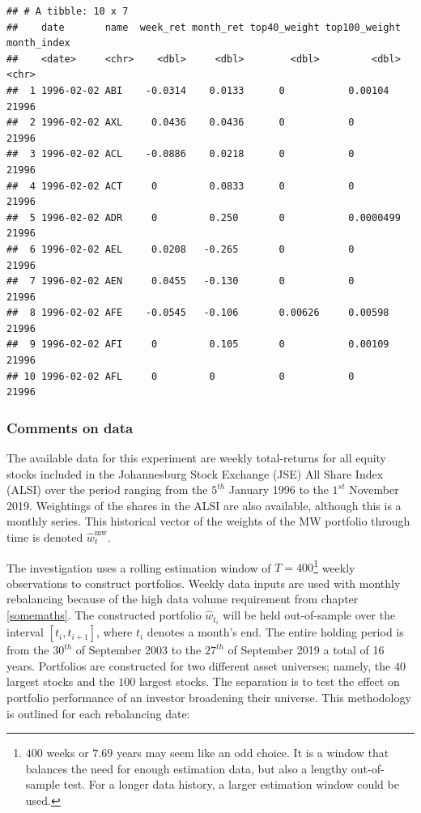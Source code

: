 \documentclass[
]{article}
\begin{document}
\begin{verbatim}
## # A tibble: 10 x 7
##    date       name  week_ret month_ret top40_weight top100_weight month_index
##    <date>     <chr>    <dbl>     <dbl>        <dbl>         <dbl> <chr>      
##  1 1996-02-02 ABI    -0.0314    0.0133      0           0.00104   21996      
##  2 1996-02-02 AXL     0.0436    0.0436      0           0         21996      
##  3 1996-02-02 ACL    -0.0886    0.0218      0           0         21996      
##  4 1996-02-02 ACT     0         0.0833      0           0         21996      
##  5 1996-02-02 ADR     0         0.250       0           0.0000499 21996      
##  6 1996-02-02 AEL     0.0208   -0.265       0           0         21996      
##  7 1996-02-02 AEN     0.0455   -0.130       0           0         21996      
##  8 1996-02-02 AFE    -0.0545   -0.106       0.00626     0.00598   21996      
##  9 1996-02-02 AFI     0         0.105       0           0.00109   21996      
## 10 1996-02-02 AFL     0         0           0           0         21996
\end{verbatim}

\hypertarget{comments-on-data}{%
\subsubsection{Comments on data}\label{comments-on-data}}

The available data for this experiment are weekly total-returns for all equity stocks included in the
Johannesburg Stock Exchange (JSE) All Share Index (ALSI) over the period ranging from the \(5^{th}\)
January 1996 to the \(1^{st}\) November 2019. Weightings of the shares in the ALSI are also available,
although this is a monthly series. This historical vector of the weights of the MW portfolio through
time is denoted \(\hat{w}^{\text{mw}}_t\).

The investigation uses a rolling estimation window of \(T = 400\)\footnote{\(400\) weeks or \(7.69\) years
  may seem like an odd choice. It is a window that balances the need for enough estimation data, but also
  a lengthy out-of-sample test. For a longer data history, a larger estimation window could be used.}
weekly observations to construct portfolios. Weekly data inputs are used with monthly rebalancing
because of the high data volume requirement from chapter \ref{somemaths}. The constructed portfolio
\(\hat{w}_{t_i}\) will be held out-of-sample over the interval \([t_i, t_{i + 1}]\), where \(t_i\) denotes a
month's end. The entire holding period is from the \(30^{th}\) of September 2003 to the \(27^{th}\) of
September 2019 a total of 16 years. Portfolios are constructed for two different asset universes;
namely, the \(40\) largest stocks and the \(100\) largest stocks. The separation is to test the effect on
portfolio performance of an investor broadening their universe. This methodology is outlined for each
rebalancing date:
\end{document}
